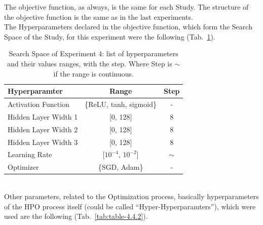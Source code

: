 The objective function, as always, is the same for each Study. The structure of the objective function is the same as in the last experiments.
% 
\\[0.3cm]The Hyperparameters declared in the objective function, which form the Search Space of the Study, for this experiment were the following (Tab.~\ref{tab:table-4.4.1}).
\begin{table}[ht!]
	\center
	\setlength{\tabcolsep}{0.5cm}
	\caption[Search Space of Experiment 4]{Search Space of Experiment 4: list of hyperparameters and their values ranges, with the step. Where Step is $\sim$ if the range is continuous.}
	\begin{tabular}{@{}lcc@{}}
		\toprule
		\textbf{Hyperparamter} & \textbf{Range}             & \textbf{Step} \\ \midrule
		Activation Function    & \{ReLU, tanh, sigmoid\}    & -             \\[0.1cm]
		Hidden Layer Width 1   & {[}0, 128{]}               & 8             \\[0.1cm]
		Hidden Layer Width 2   & {[}0, 128{]}               & 8             \\[0.1cm]
		Hidden Layer Width 3   & {[}0, 128{]}               & 8             \\[0.1cm]
		Learning Rate          & {[}$10^{-4}$, $10^{-2}${]} & $\sim$        \\[0.1cm]
		Optimizer              & \{SGD, Adam\}              & -             \\ \bottomrule
	\end{tabular}
	\label{tab:table-4.4.1}
\end{table}
% 
\\[0.3cm]Other parameters, related to the Optimization process, basically hyperparameters of the HPO process itself (could be called “Hyper-Hyperparamters”), which were used are the following (Tab.~\ref{tab:table-4.4.2}).
